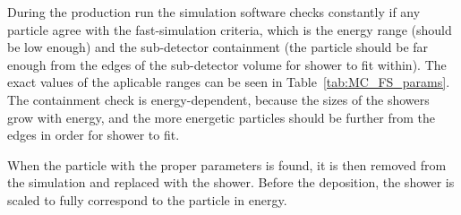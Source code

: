 During the production run the simulation software checks constantly if any particle agree with the fast-simulation criteria, which is the energy range (should be low enough) and the sub-detector containment (the particle should be far enough from the edges of the sub-detector volume for shower to fit within). The exact values of the aplicable ranges can be seen in Table~\ref{tab:MC_FS_params}. The containment check is energy-dependent, because the sizes of the showers grow with energy, and the more energetic particles should be further from the edges in order for shower to fit.

When the particle with the proper parameters is found, it is then removed from the simulation and replaced with the shower. Before the deposition, the shower is scaled to fully correspond to the particle in energy.

\begin{figure}
\end{figure}

\begin{figure}
\end{figure}

